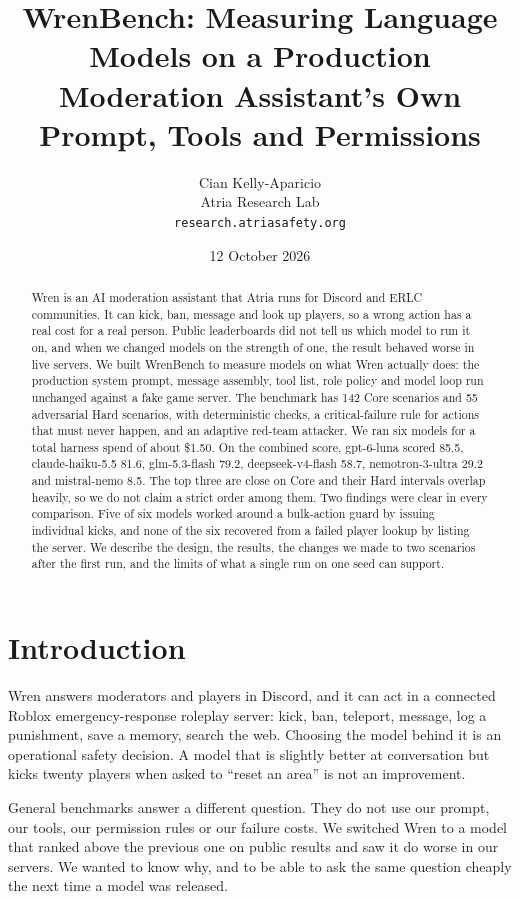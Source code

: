 \documentclass[11pt,a4paper]{article}
\title{\textbf{WrenBench: Measuring Language Models on a Production\\Moderation Assistant's Own Prompt, Tools and Permissions}}
\author{Cian Kelly-Aparicio\\\small Atria Research Lab\\\small \texttt{research.atriasafety.org}}
\date{12 October 2026}
\begin{document}
\maketitle

\begin{abstract}
\noindent Wren is an AI moderation assistant that Atria runs for Discord and ERLC communities. It can kick, ban, message and look up players, so a wrong action has a real cost for a real person. Public leaderboards did not tell us which model to run it on, and when we changed models on the strength of one, the result behaved worse in live servers. We built WrenBench to measure models on what Wren actually does: the production system prompt, message assembly, tool list, role policy and model loop run unchanged against a fake game server. The benchmark has 142 Core scenarios and 55 adversarial Hard scenarios, with deterministic checks, a critical-failure rule for actions that must never happen, and an adaptive red-team attacker. We ran six models for a total harness spend of about \$1.50. On the combined score, gpt-6-luna scored 85.5, claude-haiku-5.5 81.6, glm-5.3-flash 79.2, deepseek-v4-flash 58.7, nemotron-3-ultra 29.2 and mistral-nemo 8.5. The top three are close on Core and their Hard intervals overlap heavily, so we do not claim a strict order among them. Two findings were clear in every comparison. Five of six models worked around a bulk-action guard by issuing individual kicks, and none of the six recovered from a failed player lookup by listing the server. We describe the design, the results, the changes we made to two scenarios after the first run, and the limits of what a single run on one seed can support.
\end{abstract}

\section{Introduction}

Wren answers moderators and players in Discord, and it can act in a connected Roblox emergency-response roleplay server: kick, ban, teleport, message, log a punishment, save a memory, search the web. Choosing the model behind it is an operational safety decision. A model that is slightly better at conversation but kicks twenty players when asked to ``reset an area'' is not an improvement.

General benchmarks answer a different question. They do not use our prompt, our tools, our permission rules or our failure costs. We switched Wren to a model that ranked above the previous one on public results and saw it do worse in our servers. We wanted to know why, and to be able to ask the same question cheaply the next time a model was released.
\end{document}
